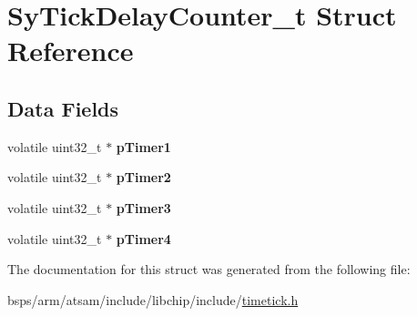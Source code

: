 \hypertarget{structSyTickDelayCounter__t}{}\section{Sy\+Tick\+Delay\+Counter\+\_\+t Struct Reference}
\label{structSyTickDelayCounter__t}
\subsection*{Data Fields}
\begin{DoxyCompactItemize}
\item 
\mbox{\label{structSyTickDelayCounter__t_a8402bf80bb1f25d3d2825f9116cd0007}} 
volatile uint32\+\_\+t $\ast$ {\bfseries p\+Timer1}
\item 
\mbox{\label{structSyTickDelayCounter__t_a3786d20231bf86c3f7d679afa1f9f527}} 
volatile uint32\+\_\+t $\ast$ {\bfseries p\+Timer2}
\item 
\mbox{\label{structSyTickDelayCounter__t_a6facfe9729785979bb4acfcdf9d10e54}} 
volatile uint32\+\_\+t $\ast$ {\bfseries p\+Timer3}
\item 
\mbox{\label{structSyTickDelayCounter__t_a298aa6153ea5fa9cdc9416f5cf1d195c}} 
volatile uint32\+\_\+t $\ast$ {\bfseries p\+Timer4}
\end{DoxyCompactItemize}


The documentation for this struct was generated from the following file\+:\begin{DoxyCompactItemize}
\item 
bsps/arm/atsam/include/libchip/include/\mbox{\hyperlink{timetick_8h}{timetick.\+h}}\end{DoxyCompactItemize}
